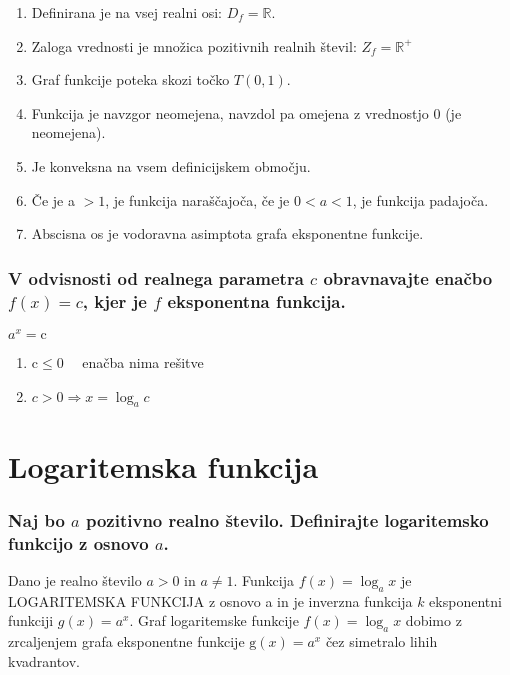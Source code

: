 \documentclass{article}
\begin{document}
\begin{enumerate}
  \item Definirana je na vsej realni osi: $D_{f}=\mathbb{R}$.

  \item Zaloga vrednosti je množica pozitivnih realnih števil: $Z_{f}=\mathbb{R}^{+}$

  \item Graf funkcije poteka skozi točko $T(0,1)$.

  \item Funkcija je navzgor neomejena, navzdol pa omejena z vrednostjo 0 (je neomejena).

  \item Je konveksna na vsem definicijskem območju.

  \item Če je a $>1$, je funkcija naraščajoča, če je $0<a<1$, je funkcija padajoča.

  \item Abscisna os je vodoravna asimptota grafa eksponentne funkcije.

\end{enumerate}

\subsubsection*{V odvisnosti od realnega parametra $c$ obravnavajte enačbo $f(x)=c$, kjer je $f$ eksponentna funkcija.}

$a^{x}=\mathrm{c}$

\begin{enumerate}
  \item $\mathrm{c} \leq 0 \quad$ enačba nima rešitve

  \item $c>0 \Rightarrow x=\log _{a} c$

\end{enumerate}

\section{Logaritemska funkcija}
\subsubsection*{Naj bo $a$ pozitivno realno število. Definirajte logaritemsko funkcijo z osnovo $a$.}

Dano je realno število $a>0$ in $a \neq 1$. Funkcija $f(x)=\log _{a} x$ je LOGARITEMSKA FUNKCIJA z osnovo a in je inverzna funkcija $k$ eksponentni funkciji $g(x)=a^{x}$. Graf logaritemske funkcije $f(x)=\log _{a} x$ dobimo z zrcaljenjem grafa eksponentne funkcije $\mathrm{g}(x)=a^{x}$ čez simetralo lihih kvadrantov.
\end{document}
